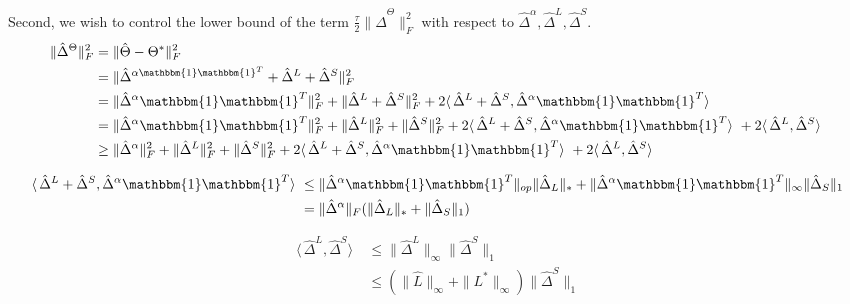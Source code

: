 \documentclass{article}
\begin{document}
Second, we wish to control the lower bound of the term  $\frac{\tau}{2}\|\hat{\Delta}^{\Theta}\|_{F}^{2}$ with respect to $\hat{\Delta}^{\alpha},\hat{\Delta}^{L},\hat{\Delta}^{S}$.
\begin{align}
\|\hat{\Delta}^{\Theta}\|_{F}^{2} 
&= \|\hat{\Theta}-\Theta^{*} \|_{F}^{2} \\
&= \|\hat\Delta^{\alpha\mathbbm{1}\mathbbm{1}^T} + \hat\Delta^{L} + \hat\Delta^{S}\|_{F}^{2} \\
&= \|\hat{\Delta}^{\alpha}\mathbbm{1}\mathbbm{1}^T\|_{F}^{2} + \|\hat{\Delta}^{L}+\hat{\Delta}^{S}\|_{F}^{2} + 
2 \langle\, \hat\Delta^{L} + \hat\Delta^{S} ,\hat{\Delta}^{\alpha}\mathbbm{1}\mathbbm{1}^T \rangle\ \\
&=  \|\hat{\Delta}^{\alpha}\mathbbm{1}\mathbbm{1}^T\|_{F}^{2} + \|\hat{\Delta}^{L}\|_{F}^{2} + \|\hat{\Delta}^{S}\|_{F}^{2} + 
2 \langle\, \hat\Delta^{L} + \hat\Delta^{S} ,\hat{\Delta}^{\alpha}\mathbbm{1}\mathbbm{1}^T \rangle\ +
2 \langle\, \hat\Delta^{L}, \hat\Delta^{S} \rangle\ \\
& \geq \|\hat{\Delta}^{\alpha}\|_{F}^{2} + \|\hat{\Delta}^{L}\|_{F}^{2} + \|\hat{\Delta}^{S}\|_{F}^{2} + 
2 \langle\, \hat\Delta^{L} + \hat\Delta^{S} ,\hat{\Delta}^{\alpha}\mathbbm{1}\mathbbm{1}^T \rangle\ +
2 \langle\, \hat\Delta^{L}, \hat\Delta^{S} \rangle\ 
\end{align}

\begin{align}
    \langle\, \hat\Delta^{L} + \hat\Delta^{S} ,\hat{\Delta}^{\alpha}\mathbbm{1}\mathbbm{1}^T \rangle\ 
    &\leq \| \hat{\Delta}^{\alpha}\mathbbm{1}\mathbbm{1}^T \|_{op} 
    \|\hat{\Delta}_{L}\|_{*} + \| \hat{\Delta}^{\alpha}\mathbbm{1}\mathbbm{1}^T \|_{\infty} 
    \|\hat{\Delta}_{S}\|_1 \\
    &= \|\hat{\Delta}^{\alpha}\|_{F}(\|\hat{\Delta}_{L}\|_{*} + \|\hat{\Delta}_{S}\|_1)
\end{align}

\begin{align}
    \langle\, \hat\Delta^{L}, \hat\Delta^{S} \rangle\ 
    &\leq \|\hat{\Delta}^{L}\|_{\infty} \|\hat{\Delta}^{S}\|_1 \\
    &\leq (\|\hat{L}\|_{\infty} + \|L^{*}\|_{\infty}) \|\hat{\Delta}^{S}\|_1
\end{align}
\end{document}
